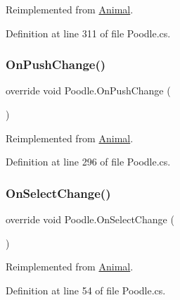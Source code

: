 Reimplemented from \mbox{\hyperlink{class_animal_aebce764681f2a949d72b80766beb0752}{Animal}}.



Definition at line 311 of file Poodle.\+cs.

\mbox{\label{class_poodle_a5c281a37883590cab7ffd1bd361e4eac}} 
\subsubsection{\texorpdfstring{On\+Push\+Change()}{OnPushChange()}}
{\footnotesize\ttfamily override void Poodle.\+On\+Push\+Change (\begin{DoxyParamCaption}{ }\end{DoxyParamCaption})\hspace{0.3cm}{\ttfamily [virtual]}}



Reimplemented from \mbox{\hyperlink{class_animal_a001734bbca74a2240ab30be09746ecd1}{Animal}}.



Definition at line 296 of file Poodle.\+cs.

\mbox{\label{class_poodle_a57d0ab14cdd7ac693e010ca42fe52a6e}} 
\subsubsection{\texorpdfstring{On\+Select\+Change()}{OnSelectChange()}}
{\footnotesize\ttfamily override void Poodle.\+On\+Select\+Change (\begin{DoxyParamCaption}{ }\end{DoxyParamCaption})\hspace{0.3cm}{\ttfamily [virtual]}}



Reimplemented from \mbox{\hyperlink{class_animal_a10f83b51d56e077b400cf6b81b8f9aed}{Animal}}.



Definition at line 54 of file Poodle.\+cs.

\mbox{\label{class_poodle_a48df28b8984d812658dae3516e9e421a}} 
